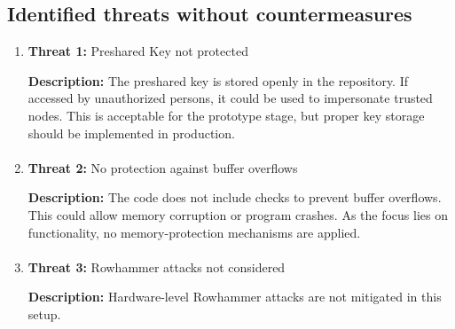 \subsection{Identified threats without countermeasures}

\begin{enumerate}
		\item \textbf{Threat 1:} Preshared Key not protected

            \textbf{Description:} The preshared key is stored openly in the repository. If accessed by unauthorized persons, it could be used to impersonate trusted nodes. This is acceptable for the prototype stage, but proper key storage should be implemented in production.
            
        \paragraph{}
		\item \textbf{Threat 2:} No protection against buffer overflows
        
            \textbf{Description:} The code does not include checks to prevent buffer overflows. This could allow memory corruption or program crashes. As the focus lies on functionality, no memory-protection mechanisms are applied.

        \paragraph{}
		\item \textbf{Threat 3:} Rowhammer attacks not considered
        
            \textbf{Description:} Hardware-level Rowhammer attacks are not mitigated in this setup.


	\end{enumerate}
